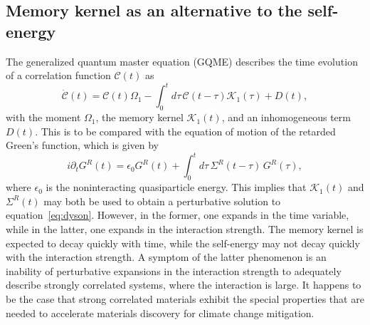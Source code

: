 \documentclass[letterpaper]{article}
\begin{document}
\subsection{Memory kernel as an alternative to the self-energy}
The generalized quantum master equation (GQME) describes the time evolution of a correlation function $\mathcal{C}(t)$ as
\begin{equation}
\dot{\mathcal{C}}(t) = \mathcal{C}(t) {\Omega_1} - \int_{0}^{t} d \tau\, \mathcal{C}(t - \tau) \mathcal{K}_1(\tau) + D(t),
\label{eq:gqme}
\end{equation}
with the moment $\Omega_1$, the memory kernel $\mathcal{K}_1(t)$, and an inhomogeneous term $D(t)$\cite{Mori1965-mf}. This is to be compared with the equation of motion of the retarded Green's function, which is given by
\begin{equation}
i\partial_t G^R(t) =  \epsilon_0 G^R(t)  + \int_0^t d\tau\, \Sigma^R(t - \tau)\, G^R(\tau),
\end{equation}
where $\epsilon_0$ is the noninteracting quasiparticle energy. 
This implies that $\mathcal{K}_1(t)$ and $\Sigma^R(t)$ may both be used to obtain a perturbative solution to equation~\ref{eq:dyson}. However, in the former, one expands in the time variable, while in the latter, one expands in the interaction strength. The memory kernel is expected to decay quickly with time\cite{Ivander2024-fr,Du2023-kd}, while the self-energy may not decay quickly with the interaction strength\cite{Mahan2014-ad}. A symptom of the latter phenomenon is an inability of perturbative expansions in the interaction strength to adequately describe strongly correlated systems, where the interaction is large. It happens to be the case that strong correlated materials exhibit the special properties that are needed to accelerate materials discovery for climate change mitigation.






\newpage

\end{document}
